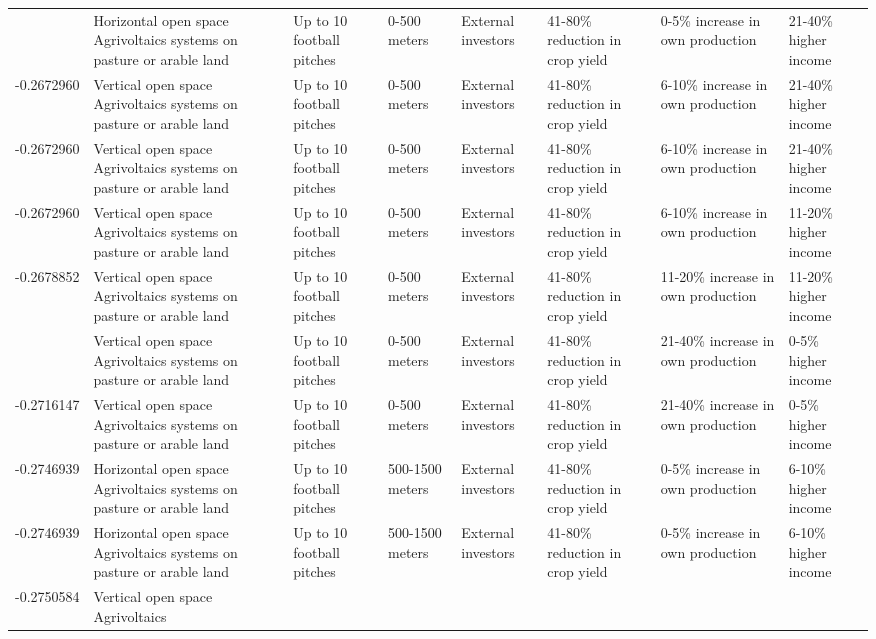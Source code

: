 \begin{table}
\begin{tabular}[t]{rlllllll}
\addlinespace
-0.2668925 & Horizontal open space Agrivoltaics
systems on pasture or arable land & Up to 10 football pitches & 0-500 meters & External investors & 41-80\% reduction in crop yield & 0-5\% increase in own production & 21-40\% higher income\\
-0.2672960 & Vertical open space Agrivoltaics
systems on pasture or arable land & Up to 10 football pitches & 0-500 meters & External investors & 41-80\% reduction in crop yield & 6-10\% increase in own production & 21-40\% higher income\\
-0.2672960 & Vertical open space Agrivoltaics
systems on pasture or arable land & Up to 10 football pitches & 0-500 meters & External investors & 41-80\% reduction in crop yield & 6-10\% increase in own production & 21-40\% higher income\\
-0.2672960 & Vertical open space Agrivoltaics
systems on pasture or arable land & Up to 10 football pitches & 0-500 meters & External investors & 41-80\% reduction in crop yield & 6-10\% increase in own production & 11-20\% higher income\\
-0.2678852 & Vertical open space Agrivoltaics
systems on pasture or arable land & Up to 10 football pitches & 0-500 meters & External investors & 41-80\% reduction in crop yield & 11-20\% increase in own production & 11-20\% higher income\\
\addlinespace
-0.2716147 & Vertical open space Agrivoltaics
systems on pasture or arable land & Up to 10 football pitches & 0-500 meters & External investors & 41-80\% reduction in crop yield & 21-40\% increase in own production & 0-5\% higher income\\
-0.2716147 & Vertical open space Agrivoltaics
systems on pasture or arable land & Up to 10 football pitches & 0-500 meters & External investors & 41-80\% reduction in crop yield & 21-40\% increase in own production & 0-5\% higher income\\
-0.2746939 & Horizontal open space Agrivoltaics
systems on pasture or arable land & Up to 10 football pitches & 500-1500 meters & External investors & 41-80\% reduction in crop yield & 0-5\% increase in own production & 6-10\% higher income\\
-0.2746939 & Horizontal open space Agrivoltaics
systems on pasture or arable land & Up to 10 football pitches & 500-1500 meters & External investors & 41-80\% reduction in crop yield & 0-5\% increase in own production & 6-10\% higher income\\
-0.2750584 & Vertical open space Agrivoltaics

\end{tabular}
\end{table}
